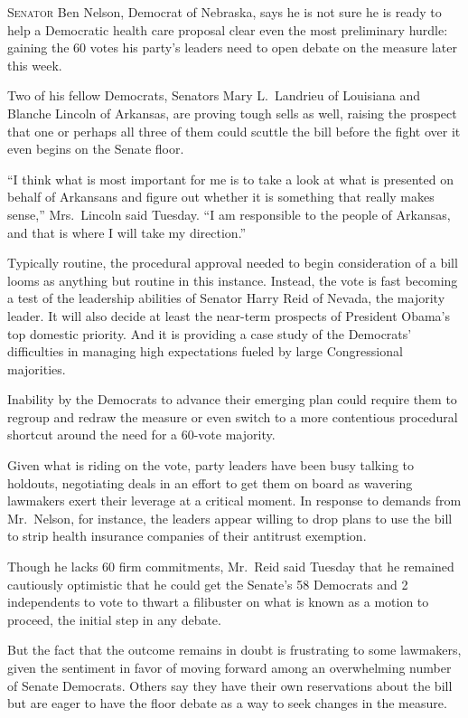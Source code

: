 ﻿\documentclass[12pt]{article}
\begin{document}
\lettrine{S}{enator} Ben Nelson, Democrat of Nebraska, says he is not sure
he is ready to help a Democratic health care proposal clear even the most preliminary hurdle:
gaining the 60 votes his party's leaders need to open debate on the measure later this week.

Two of his fellow Democrats, Senators Mary L.~Landrieu of Louisiana and Blanche Lincoln of Arkansas,
are proving tough sells as well, raising the prospect that one or perhaps all three of them could
scuttle the bill before the fight over it even begins on the Senate floor.

``I think what is most important for me is to take a look at what is presented on behalf of
Arkansans and figure out whether it is something that really makes sense,'' Mrs.~Lincoln said
Tuesday. ``I am responsible to the people of Arkansas, and that is where I will take my direction.''

Typically routine, the procedural approval needed to begin consideration of a bill looms as anything
but routine in this instance. Instead, the vote is fast becoming a test of the leadership abilities
of Senator Harry Reid of Nevada, the majority leader. It will also decide at least the near-term
prospects of President Obama's top domestic priority. And it is providing a case study of the
Democrats' difficulties in managing high expectations fueled by large Congressional majorities.

Inability by the Democrats to advance their emerging plan could require them to regroup and redraw
the measure or even switch to a more contentious procedural shortcut around the need for a 60-vote
majority.

Given what is riding on the vote, party leaders have been busy talking to holdouts, negotiating
deals in an effort to get them on board as wavering lawmakers exert their leverage at a critical
moment. In response to demands from Mr.~Nelson, for instance, the leaders appear willing to drop
plans to use the bill to strip health insurance companies of their antitrust exemption.

Though he lacks 60 firm commitments, Mr.~Reid said Tuesday that he remained cautiously optimistic
that he could get the Senate's 58 Democrats and 2 independents to vote to thwart a filibuster on
what is known as a motion to proceed, the initial step in any debate.

But the fact that the outcome remains in doubt is frustrating to some lawmakers, given the sentiment
in favor of moving forward among an overwhelming number of Senate Democrats. Others say they have
their own reservations about the bill but are eager to have the floor debate as a way to seek
changes in the measure.
\end{document}
